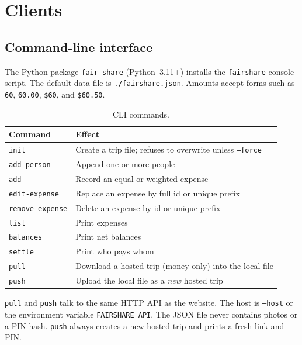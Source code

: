\documentclass[11pt,a4paper]{article}
\newcommand{\code}[1]{\texttt{#1}}
\begin{document}
\section{Clients}
\label{sec:clients}

\subsection{Command-line interface}

The Python package \code{fair-share} (Python~3.11+) installs the \code{fairshare} console script.
The default data file is \code{./fairshare.json}.
Amounts accept forms such as \code{60}, \code{60.00}, \code{\$60}, and \code{\$60.50}.

\begin{table}[ht]
\centering
\caption{CLI commands.}
\label{tab:cli}
\begin{tabular}{@{}lp{8.4cm}@{}}
\toprule
Command & Effect \\
\midrule
\code{init} & Create a trip file; refuses to overwrite unless \code{--force} \\
\code{add-person} & Append one or more people \\
\code{add} & Record an equal or weighted expense \\
\code{edit-expense} & Replace an expense by full id or unique prefix \\
\code{remove-expense} & Delete an expense by id or unique prefix \\
\code{list} & Print expenses \\
\code{balances} & Print net balances \\
\code{settle} & Print who pays whom \\
\code{pull} & Download a hosted trip (money only) into the local file \\
\code{push} & Upload the local file as a \emph{new} hosted trip \\
\bottomrule
\end{tabular}
\end{table}

\code{pull} and \code{push} talk to the same HTTP API as the website.
The host is \code{--host} or the environment variable \code{FAIRSHARE\_API}.
The JSON file never contains photos or a PIN hash.
\code{push} always creates a new hosted trip and prints a fresh link and PIN.
\end{document}
